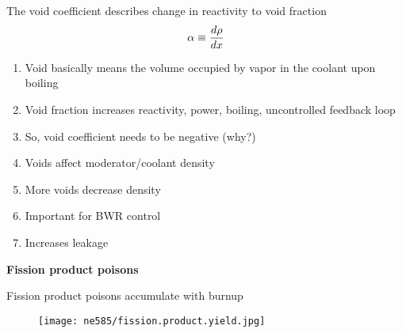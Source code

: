\documentclass[aspectratio=1610,pdftex,dvipsnames,compress,xcolor={dvipsnames}]{beamer}
\begin{document}
\addtocounter{framenumber}{-1} 
\begin{frame}{The void coefficient describes change in reactivity to void fraction}
    \begin{equation}
        \LARGE
        \alpha \equiv \frac{d\rho}{dx}
    \end{equation}

    \vspace*{\fill}

    \begin{enumerate}[series=outerlist,topsep=0pt,itemsep=15pt,leftmargin=*,label=(\arabic*)]
        \item[]Void basically means the volume occupied by vapor in the coolant upon boiling
        \item[]Void fraction increases reactivity, power, boiling, uncontrolled feedback loop
        \item[]So, void coefficient needs to be negative (why?)
        \item[]Voids affect moderator/coolant density
        \item[]More voids decrease density
        \item[]Important for BWR control
        \item[]Increases leakage
    \end{enumerate}
\end{frame}


\begin{frame}[plain]{}
    \centering\LARGE\textbf{Fission product poisons}
\end{frame}


\addtocounter{framenumber}{-1} 
\begin{frame}{Fission product poisons accumulate with burnup}
    \begin{figure}
        \centering
        \texttt{[image: ne585/fission.product.yield.jpg]}
    \end{figure}
\end{frame}
\end{document}
